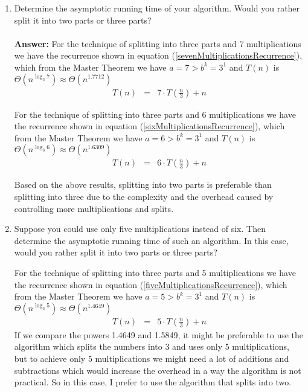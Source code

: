 \documentclass[tikz, 12pt]{scrartcl}
\begin{document}
\begin{enumerate}
\begin{enumerate}
			\item Determine the asymptotic running time of your algorithm. Would you rather split it into two parts or three parts?\\
			\\
			\textbf{Answer: } For the technique of splitting into three parts and 7 multiplications we have the recurrence shown in equation (\ref{sevenMultiplicationsRecurrence}), which from the Master Theorem we have $a = 7 >  b^k = 3^1$ and $T(n)$ is $\Theta(n^{\log_3 7}) \approx \Theta(n^{1.7712})$
			\begin{eqnarray}\label{sevenMultiplicationsRecurrence}
				T(n)	&	=	&	7\cdot T\left(\frac{n}{3}\right) + n
			\end{eqnarray}
			
			For the technique of splitting into three parts and 6 multiplications we have the recurrence shown in equation (\ref{sixMultiplicationsRecurrence}), which from the Master Theorem we have $a = 6 > b^k = 3^1$ and $T(n)$ is $\Theta(n^{\log_3 6}) \approx \Theta(n^{1.6309})$
			\begin{eqnarray}\label{sixMultiplicationsRecurrence}
				T(n)	&	=	&	6 \cdot T\left(\frac{n}{3}\right) + n
			\end{eqnarray}
			
			Based on the above results, splitting into two parts is preferable than splitting into three due to the complexity and the overhead caused by controlling more multiplications and splits.
			
			\item Suppose you could use only five multiplications instead of six. Then determine the asymptotic running time of such an algorithm. In this case, would you rather split it into two parts or three parts?
			
			For the technique of splitting into three parts and 5 multiplications we have the recurrence shown in equation (\ref{fiveMultiplicationsRecurrence}), which from the Master Theorem we have $a = 5 > b^k = 3^1$ and $T(n)$ is $\Theta(n^{\log_3 5}) \approx \Theta(n^{1.4649})$
			\begin{eqnarray}\label{fiveMultiplicationsRecurrence}
				T(n)	&	=	&	5 \cdot T\left(\frac{n}{3}\right) + n
			\end{eqnarray}
			If we compare the powers 1.4649 and 1.5849, it might be preferable to use the algorithm which splits the numbers into 3 and uses only 5 multiplications, but to achieve only 5 multiplications we might need a lot of additions and subtractions which would increase the overhead in a way the algorithm is not practical. So in this case, I prefer to use the algorithm that splits into two.
		\end{enumerate}
\end{enumerate}
\end{document}
